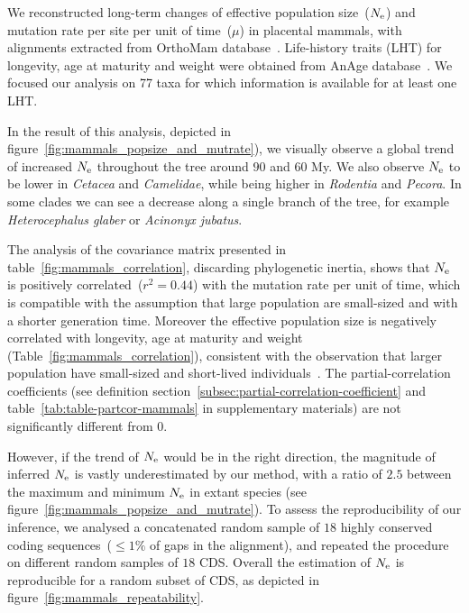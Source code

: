 We reconstructed long-term changes of effective population size~($N_{\mathrm{e}}$) and mutation rate per site per unit of time~($\mu$) in placental mammals, with alignments extracted from OrthoMam database~\citep{Ranwez2007,Scornavacca2019}.
Life-history traits (LHT) for longevity, age at maturity and weight were obtained from AnAge database~\citep{DEMAGALHAES2009,Tacutu2012}.
We focused our analysis on 77 taxa for which information is available for at least one LHT.

In the result of this analysis, depicted in figure~\ref{fig:mammals_popsize_and_mutrate}), we visually observe a global trend of increased $N_{\mathrm{e}}$ throughout the tree around $90$ and $60$ My.
We also observe $N_{\mathrm{e}}$ to be lower in \textit{Cetacea} and \textit{Camelidae}, while being higher in \textit{Rodentia} and \textit{Pecora}.
In some clades we can see a decrease along a single branch of the tree, for example \textit{Heterocephalus glaber} or \textit{Acinonyx jubatus}.

The analysis of the covariance matrix presented in table~\ref{fig:mammals_correlation}, discarding phylogenetic inertia, shows that $N_{\mathrm{e}}$ is positively correlated~($r^2 = 0.44$) with the mutation rate per unit of time, which is compatible with the assumption that large population are small-sized and with a shorter generation time.
Moreover the effective population size is negatively correlated with longevity, age at maturity and weight (Table~\ref{fig:mammals_correlation}), consistent with the observation that larger population have small-sized and short-lived individuals~\citep{Galtier2016,Romiguier2014}.
The partial-correlation coefficients (see definition section~\ref{subsec:partial-correlation-coefficient} and table~\ref{tab:table-partcor-mammals} in supplementary materials) are not significantly different from $0$.

However, if the trend of $N_{\mathrm{e}}$ would be in the right direction, the magnitude of inferred $N_{\mathrm{e}}$ is vastly underestimated by our method, with a ratio of $2.5$ between the maximum and minimum $N_{\mathrm{e}}$ in extant species (see figure~\ref{fig:mammals_popsize_and_mutrate}).
To assess the reproducibility of our inference, we analysed a concatenated random sample of $18$ highly conserved coding sequences~($\leq 1\%$ of gaps in the alignment), and repeated the procedure on different random samples of $18$ CDS.
Overall the estimation of $N_{\mathrm{e}}$ is reproducible for a random subset of CDS, as depicted in figure~\ref{fig:mammals_repeatability}.

